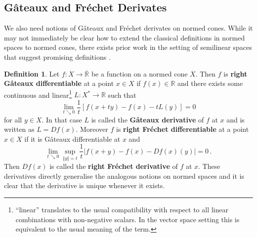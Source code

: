 \documentclass[
	paper=A4,
	pagesize=auto,
	fontsize=12pt
]{scrartcl}
\theoremstyle{plain}
\theoremstyle{remark}
\theoremstyle{definition}
\newtheorem{definition}[theorem]{Definition}
\begin{document}
\subsection{Gâteaux and Fréchet Derivates}
%
We also need notions of Gâteaux and Fréchet derivates on normed cones.
While it may not immediately be clear how to extend the classical definitions in normed spaces to normed cones, there exists prior work in the setting of semilinear spaces that suggest promising definitions \cite{src:Galanis:DiffabilityOnSemilinearSpaces,src:Sadeqi:DiffabilityOnSemilinearSpaces}.
%
\begin{definition}
Let $f : X \to \overline{\mathbb{R}}$ be a function on a normed cone $X$.
Then $f$ is \textbf{right Gâteaux differentiable} at a point $x \in X$ if $f(x) \in \mathbb{R}$ and there exists some continuous and linear\footnote{\enquote{linear} translates to the usual compatibility with respect to all linear combinations with non-negative scalars. In the vector space setting this is equivalent to the usual meaning of the term.} $L : X^* \to \mathbb{R}$ such that
%
\begin{equation}
\lim_{ t  \searrow 0 } \frac{1}{t} \left[ f \left( x + t y \right) - f \left( x \right) - t L \left( y \right) \right] = 0
\end{equation}
%
for all $y \in X$.
In that case $L$ is called the \textbf{Gâteaux derivative} of $f$ at $x$ and is written as $L = Df(x)$.
Moreover $f$ is \textbf{right Fréchet differentiable} at a point $x \in X$ if it is Gâteaux differentiable at $x$ and
%
\begin{equation}
\lim_{ t  \searrow 0 } \sup_{\Vert y \Vert = t} \frac{1}{t} \left| f \left( x + y \right) - f \left( x \right) - D f \left( x \right) \left( y \right) \right| = 0 \, .
\end{equation}
%
Then $Df(x)$ is called the \textbf{right Fréchet derivative} of $f$ at $x$.
These derivatives directly generalise the analogous notions on normed spaces and it is clear that the derivative is unique whenever it exists.
\end{definition}
%
\end{document}

